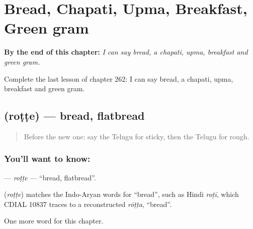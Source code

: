 
\chapter{Bread, Chapati, Upma, Breakfast, Green gram}
\label{ch:te-bread-chapati-upma-breakfast-green-gram}

\begin{chapteropening}
\textbf{By the end of this chapter:} \emph{I can say bread, a chapati, upma, breakfast and green gram.}

Complete the last lesson of chapter 262: I can say bread, a chapati, upma, breakfast and green gram.
\end{chapteropening}

\section[\texorpdfstring{\te{రొట్టె} (roṭṭe)}{రొట్టె (roṭṭe)}]{ (roṭṭe) — bread, flatbread}

\label{lesson:TE-C262-rotte}



\begin{quote}
Before the new one: say the Telugu for sticky, then the Telugu for rough.
\end{quote}

\subsection*{You'll want to know: }
\textbf{} — \emph{roṭṭe} — \textquotedblleft{}bread, flatbread\textquotedblright{}.

\begin{cousinweb}
\textbf{} (\emph{roṭṭe}) matches the Indo-Aryan words for \textquotedblleft{}bread\textquotedblright{}, such as Hindi \emph{roṭī}, which CDIAL 10837 traces to a reconstructed \emph{rōṭṭa}, \textquotedblleft{}bread\textquotedblright{}.
\end{cousinweb}

\begin{grammarlens}[title={What you've built}]
One more word for this chapter.
\end{grammarlens}

